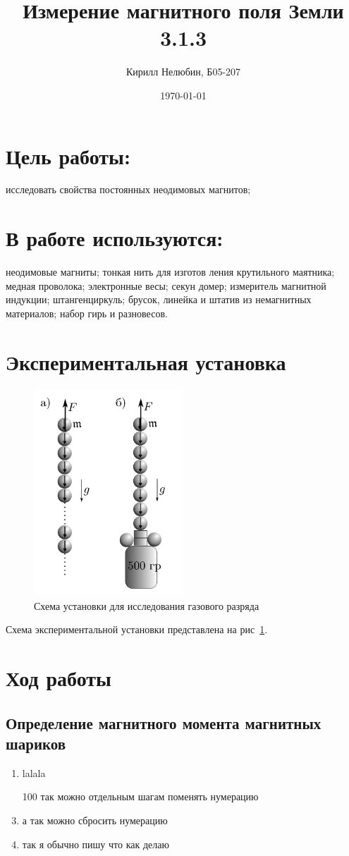 \documentclass[11pt, a4paper]{article}
\title{Измерение магнитного поля Земли \\ 3.1.3}
\author{Кирилл Нелюбин, Б05-207}
\date{\today}
\begin{document}
\maketitle

\section*{Цель работы:}
исследовать свойства постоянных неодимовых магнитов;
\section*{В работе используются:}  
неодимовые магниты; тонкая нить для изготов­
ления крутильного маятника; медная проволока; электронные весы; секун­
домер; измеритель магнитной индукции; штангенциркуль; брусок, линейка
и штатив из немагнитных материалов; набор гирь и разновесов.

\section*{Экспериментальная установка}
\begin{figure}[H]
  \includegraphics*[width=0.5\textwidth]{2023-10-02-00-43-23.png}
  \caption{Схема установки для исследования газового разряда}
  \label{fig:ust}
\end{figure}
\noindent Схема экспериментальной установки представлена на рис~\ref{fig:ust}.


\section*{Ход работы}
\subsection*{Определение магнитного момента магнитных шариков}
\begin{enumerate}
  \item lalala
  \item[100] так можно отдельным шагам поменять нумерацию
  \setcounter{enumi}{-1}
  \item а так можно сбросить нумерацию
  \item так я обычно пишу что как делаю
\end{enumerate}
\end{document}
